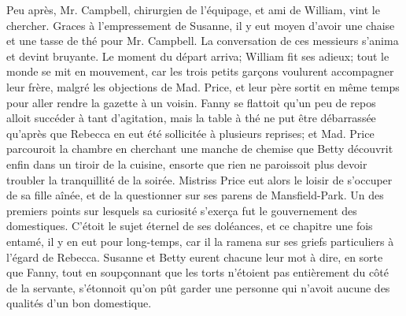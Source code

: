 Peu après, Mr. Campbell, chirurgien de l'équipage, et ami de William, vint le chercher. Graces à l'empressement de Susanne,\setcounter{page}{391} il y eut moyen d'avoir une chaise et une tasse de thé pour Mr. Campbell. La conversation de ces messieurs s'anima et devint bruyante. Le moment du départ arriva; William fit ses adieux; tout le monde se mit en mouvement, car les trois petits garçons voulurent accompagner leur frère, malgré les objections de Mad. Price, et leur père sortit en même temps pour aller rendre la gazette à un voisin.
Fanny se flattoit qu'un peu de repos alloit succéder à tant d'agitation, mais la table à thé ne put être débarrassée qu'après que Rebecca en eut été sollicitée à plusieurs reprises; et Mad. Price parcouroit la chambre en cherchant une manche de chemise que Betty découvrit enfin dans un tiroir de la cuisine, ensorte que rien ne paroissoit plus devoir troubler la tranquillité de la soirée. Mistriss Price eut alors le loisir de s'occuper de sa fille aînée, et de la questionner sur ses parens de Mansfield-Park. Un des premiers points sur lesquels sa curiosité s'exerça fut le gouvernement des domestiques. C'étoit le sujet éternel de ses doléances, et ce chapitre une fois entamé, il y en eut pour long-temps, car il la ramena sur ses griefs particuliers à l'égard de Rebecca. Susanne et Betty eurent\setcounter{page}{392} chacune leur mot à dire, en sorte que Fanny, tout en soupçonnant que les torts n’étoient pas entièrement du côté de la servante, s’étonnoit qu’on pût garder une personne qui n’avoit aucune des qualités d’un bon domestique.
